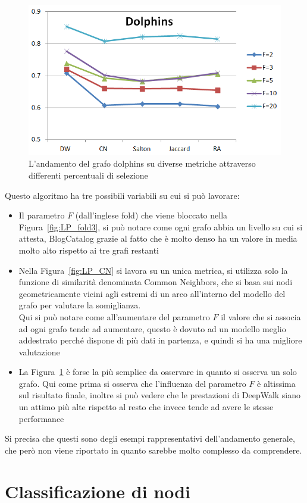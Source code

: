 %
\begin{figure}[htp]
	\centering
	\includegraphics[width=\linewidth]{immagini/LP_Dolphins}
	\caption{L'andamento del grafo dolphins su diverse metriche attraverso differenti percentuali di selezione}
	\label{fig:LP_Dolphins}
\end{figure}
Questo algoritmo ha tre possibili variabili su cui si può lavorare:
\begin{itemize}
	\item Il parametro $F$ (dall'inglese fold) che viene bloccato nella Figura~\ref{fig:LP_fold3}, si può notare come ogni grafo abbia un livello su cui si attesta, BlogCatalog grazie al fatto che è molto denso ha un valore in media molto alto rispetto ai tre grafi restanti
	\item Nella Figura~\ref{fig:LP_CN} si lavora su un unica metrica, si utilizza solo la funzione di similarità denominata Common Neighbors, che si basa sui nodi geometricamente vicini agli estremi di un arco all'interno del modello del grafo per valutare la somiglianza.\\
	Qui si può notare come all'aumentare del parametro $F$ il valore che si associa ad ogni grafo tende ad aumentare, questo è dovuto ad un modello meglio addestrato perché dispone di più dati in partenza, e quindi si ha una migliore valutazione
	\item La Figura~\ref{fig:LP_Dolphins} è forse la più semplice da osservare in quanto si osserva un solo grafo. Qui come prima si osserva che l'influenza del parametro $F$ è altissima sul risultato finale, inoltre si può vedere che le prestazioni di DeepWalk siano un attimo più alte rispetto al resto che invece tende ad avere le stesse performance 
\end{itemize}
Si precisa che questi sono degli esempi rappresentativi dell'andamento generale, che però non viene riportato in quanto sarebbe molto complesso da comprendere.
%
\section{Classificazione di nodi}



%
%
%
